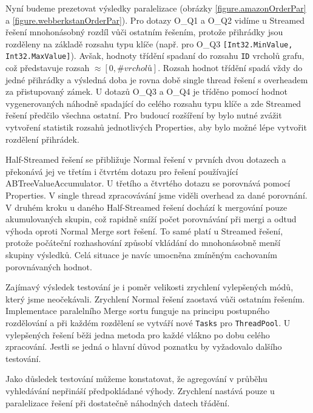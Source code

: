 Nyní budeme prezetovat výsledky paralelizace (obrázky \ref{figure.amazonOrderPar} a \ref{figure.webberkstanOrderPar}).
Pro dotazy O\_Q1 a O\_Q2 vidíme u Streamed řešení mnohonásobný rozdíl vůči ostatním řešením, protože přihrádky jsou rozděleny na základě rozsahu typu klíče (např. pro O\_Q3 \verb+[Int32.MinValue, Int32.MaxValue]+).
Avšak, hodnoty třídění spadaní do rozsahu \verb+ID+ vrcholů grafu, což představuje rozsah $\approx [0,\#vrcholů]$. 
Rozsah hodnot třídění spadá vždy do jedné přihrádky a výsledná doba je rovna době single thread řešení s overheadem za přistupovaný zámek.
U dotazů O\_Q3 a O\_Q4 je tříděno pomocí hodnot vygenerovaných náhodně spadající do celého rozsahu typu klíče a zde Streamed řešení předčilo všechna ostatní. 
Pro budoucí rozšíření by bylo nutné zvážit vytvoření statistik rozsahů jednotlivých Properties, aby bylo možné lépe vytvořit rozdělení přihrádek.

Half-Streamed řešení se přibližuje Normal řešení v prvních dvou dotazech a překonává jej ve třetím i čtvrtém dotazu pro řešení používající ABTreeValueAccumulator.
U třetího a čtvrtého dotazu se porovnává pomocí Properties. V single thread zpracovávání jsme viděli overhead za dané porovnání.
V druhém kroku u daného Half-Streamed řešení dochází k mergování pouze akumulovaných skupin, což rapidně sníží počet porovnávání při mergi a odtud výhoda oproti Normal Merge sort řešení. 
To samé platí u Streamed řešení, protože počáteční rozhashování způsobí vkládání do mnohonásobně menší skupiny výsledků. 
Celá situace je navíc umocněna zmíněným cachovaním porovnávaných hodnot. 

Zajímavý výsledek testování je i poměr velikosti zrychlení vylepšených módů, který jsme neočekávali. 
Zrychlení Normal řešení zaostavá vůči ostatním řešením. 
Implementace paralelního Merge sortu funguje na principu postupného rozdělování a při každém rozdělení se vytváří nové \verb+Tasks+ pro \verb+ThreadPool+.
U vylepšených řešení běži jedna metoda pro každé vlákno po dobu celého zpracování. Jestli se jedná o hlavní důvod poznatku by vyžadovalo dalšího testování. 

Jako důsledek testování můžeme konstatovat, že agregování v průběhu vyhledávání nepřináší předpokládané výhody.
Zrychlení nastává pouze u paralelizace řešení při dostatečně náhodných datech třádění.

